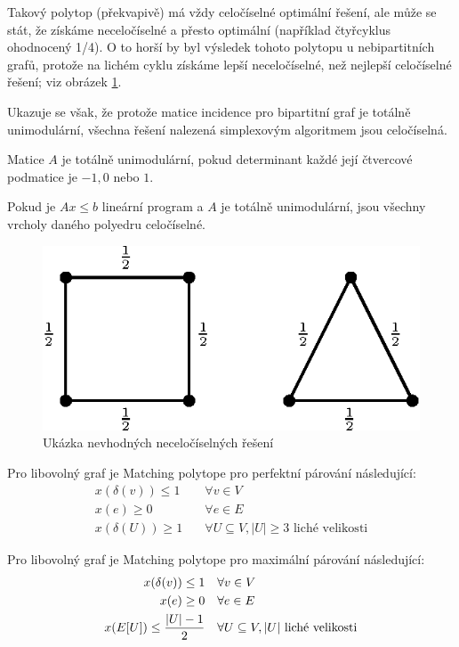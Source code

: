 Takový polytop (překvapivě) má vždy celočíselné optimální řešení, ale může se 
stát, že získáme neceločíselné a přesto optimální (například čtyřcyklus 
ohodnocený 1/4). O to horší by byl výsledek tohoto polytopu u nebipartitních 
grafů, protože na lichém cyklu získáme lepší neceločíselné, než nejlepší 
celočíselné řešení; viz obrázek \ref{matching-polytope}.

Ukazuje se však, že protože matice incidence pro bipartitní graf je totálně 
unimodulární, všechna řešení nalezená simplexovým algoritmem jsou celočíselná.

\df Matice $A$ je totálně unimodulární, pokud determinant každé její čtvercové 
podmatice je $-1, 0$ nebo $1$.

\df Pokud je $Ax \leq b$ lineární program a $A$ je totálně unimodulární, jsou 
všechny vrcholy daného polyedru celočíselné.

\begin{figure}[h!]
	\centering
	\includegraphics{img/matching-polytope.eps}
	\caption{Ukázka nevhodných neceločíselných řešení}
	\label{matching-polytope}
\end{figure}

\tv Pro libovolný graf je Matching polytope pro perfektní párování následující:
\begin{align}
	x(\delta(v)) \leq 1  & \quad  \forall v \in V \\
	x(e) \geq 0 & \quad \forall e  \in E \\
	x(\delta(U)) \geq 1 & \quad \forall U \subseteq V, |U| \geq 3 \text{ liché 
velikosti}
\end{align}

\tv Pro libovolný graf je Matching polytope pro maximální párování následující:
\begin{align}
	x(\delta(v)) \leq 1  & \quad  \forall v \in V \\
	x(e) \geq 0 & \quad \forall e  \in E \\
	x(E[U]) \leq {|U|-1 \over 2} & \quad \forall U \subseteq V, |U| \text{ liché 
velikosti}
\end{align}
